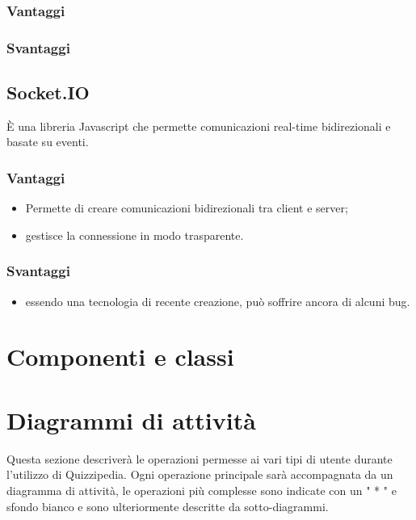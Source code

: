 \documentclass[a4paper, titlepage]{article}
\begin{document}
\subsubsection{Vantaggi}

\subsubsection{Svantaggi}

\subsection{Socket.IO}
È una libreria Javascript che permette comunicazioni real-time bidirezionali e basate su eventi.

\subsubsection{Vantaggi}

\begin{itemize}
	\item Permette di creare comunicazioni bidirezionali tra client e server;
	\item gestisce la connessione in modo trasparente.
\end{itemize}

\subsubsection{Svantaggi}

\begin{itemize}
	\item essendo una tecnologia di recente creazione, può soffrire ancora di alcuni bug.
\end{itemize}

\section{Componenti e classi}


\newpage
\section{Diagrammi di attività}
Questa sezione descriverà le operazioni permesse ai vari tipi di utente durante l’utilizzo di Quizzipedia. Ogni operazione principale sarà accompagnata da un diagramma di attività, le operazioni più complesse sono indicate con un " * " e sfondo bianco e sono ulteriormente descritte da sotto-diagrammi.
\end{document}
